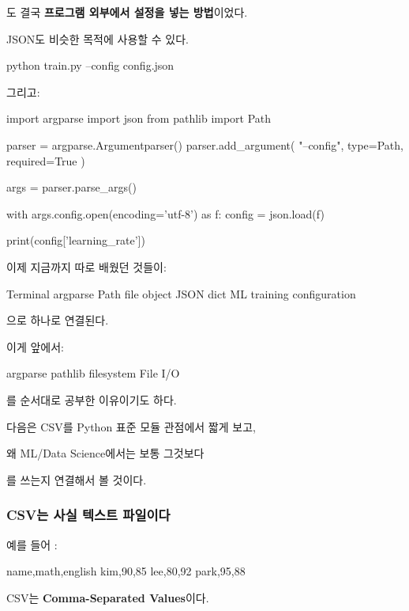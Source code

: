 도 결국 \textbf{프로그램 외부에서 설정을 넣는 방법}이었다.

JSON도 비슷한 목적에 사용할 수 있다.

\begin{dhkzsh}
python train.py --config config.json
\end{dhkzsh}

그리고:

\begin{dhkcode}
import argparse
import json
from pathlib import Path

parser = argparse.Argumentparser()
parser.add_argument(
    "--config",
    type=Path,
    required=True
)

args = parser.parse_args()

with args.config.open(encoding='utf-8') as f:
    config = json.load(f)

print(config['learning_rate'])
\end{dhkcode}

이제 지금까지 따로 배웠던 것들이:

\begin{dhksmry}[centered]
Terminal
\da
argparse
\da
Path
\da
file object
\da
JSON
\da
dict
\da
ML training configuration
\end{dhksmry}

으로 하나로 연결된다.

이게 앞에서:

\begin{dhksmry}[centered]
argparse \ra pathlib \ra filesystem \ra File I/O    
\end{dhksmry}

를 순서대로 공부한 이유이기도 하다.

다음은 CSV를 Python 표준  모듈 관점에서 짧게 보고,

왜 ML/Data Science에서는 보통 그것보다

를 쓰는지 연결해서 볼 것이다.

\subsubsection{CSV는 사실 텍스트 파일이다}

예를 들어 :

\begin{dhkzsh}
name,math,english
kim,90,85
lee,80,92
park,95,88
\end{dhkzsh}

CSV는 \textbf{Comma-Separated Values}이다.

